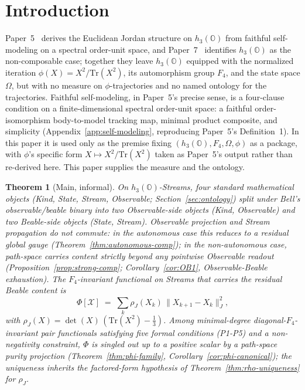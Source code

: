 \documentclass[12pt]{article}
\newtheorem{theorem}{Theorem}
\theoremstyle{remark}
\newcommand{\hthree}{h_3(\mathbb{O})}
\newcommand{\Ffour}{F_4}
\newcommand{\rhoJ}{\rho_J}
\newcommand{\Phiexp}{\Phi}
\newcommand{\Stream}{\mathcal{X}}
\newcommand{\Tr}{\mathrm{Tr}}
\newcommand{\Jnorm}[1]{\lVert #1 \rVert_J}
\begin{document}

\section{Introduction}
\label{sec:intro}

Paper~5~\cite{ehrlich2026qm} derives the Euclidean Jordan structure on
$\hthree$ from faithful self-modeling on a spectral order-unit space,
and Paper~7~\cite{ehrlich2026h3o} identifies $\hthree$ as the
non-composable case; together they leave $\hthree$ equipped with the
normalized iteration $\phi(X) = X^2/\Tr(X^2)$, its automorphism group
$\Ffour$, and the state space $\Omega$, but with no measure on
$\phi$-trajectories and no named ontology for the trajectories.
Faithful self-modeling, in Paper~5's precise sense, is a
four-clause condition on a finite-dimensional spectral order-unit
space: a faithful order-isomorphism body-to-model tracking map,
minimal product composite, and simplicity
(Appendix~\ref{app:self-modeling}, reproducing Paper~5's
Definition~1). In this paper it is used only as the premise
fixing $(\hthree, \Ffour, \Omega, \phi)$ as a package, with
$\phi$'s specific form $X \mapsto X^2/\Tr(X^2)$ taken as Paper~5's
output rather than re-derived here. This paper supplies the
measure and the ontology.

\begin{theorem}[Main, informal]\label{thm:main-informal}
On $\hthree$-Streams, four standard mathematical objects
(Kind, State, Stream, Observable; Section~\ref{sec:ontology}) split
under Bell's observable/beable binary into two Observable-side
objects (Kind, Observable) and two Beable-side objects (State,
Stream). Observable projection and Stream propagation do not
commute: in the autonomous case this reduces to a residual global
gauge (Theorem~\ref{thm:autonomous-comp}); in the non-autonomous
case, path-space carries content strictly beyond any pointwise
Observable readout
(Proposition~\ref{prop:strong-comp};
Corollary~\ref{cor:OB1}, Observable-Beable exhaustion). The
$\Ffour$-invariant functional on Streams that carries the residual
Beable content is
\begin{equation}\label{eq:phi-intro}
  \Phiexp[\Stream] \;=\; \sum_k \rhoJ(X_k)\,\Jnorm{X_{k+1} - X_k}^2,
\end{equation}
with $\rhoJ(X) = \det(X)\,(\Tr(X^2) - \tfrac{1}{3})$. Among
minimal-degree diagonal-$\Ffour$-invariant pair functionals
satisfying five formal conditions (P1-P5) and a non-negativity
constraint, $\Phiexp$ is singled out up to a positive scalar by a
path-space purity projection
(Theorem~\ref{thm:phi-family}, Corollary~\ref{cor:phi-canonical});
the uniqueness inherits the factored-form hypothesis of
Theorem~\ref{thm:rho-uniqueness} for $\rhoJ$.
\end{theorem}
\end{document}
